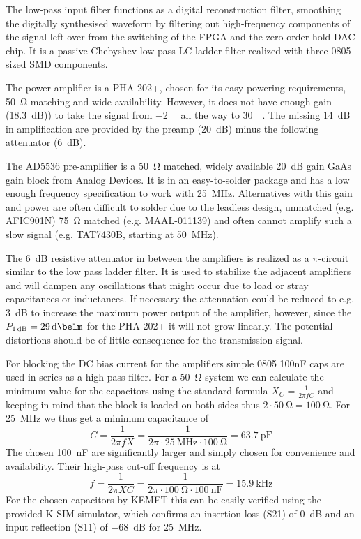 The low-pass input filter functions as a digital reconstruction filter, smoothing the digitally synthesised waveform by filtering out high-frequency components of the signal left over from the switching of the FPGA and the zero-order hold DAC chip. It is a passive Chebyshev low-pass LC ladder filter realized with three 0805-sized SMD components.

The power amplifier is a PHA-202+, chosen for its easy powering requirements, \qty{50}{\ohm} matching and wide availability. However, it does not have enough gain (\qty{18.3}{\deci\bel})) to take the signal from \qty{-2}{\deci\belm} all the way to \qty{+30}{\deci\belm}. The missing \qty{14}{\deci\bel} in amplification are provided by the preamp (\qty{20}{\deci\bel}) minus the following attenuator (\qty{6}{\deci\bel}).

The AD5536 pre-amplifier is a \qty{50}{\ohm} matched, widely available \qty{20}{\deci\bel} gain GaAs gain block from Analog Devices. It is in an easy-to-solder package and has a low enough frequency specification to work with \qty{25}{\mega\hertz}. Alternatives with this gain and power are often difficult to solder due to the leadless design, unmatched (e.g. AFIC901N) \qty{75}{\ohm} matched (e.g. MAAL-011139) and often cannot amplify such a slow signal (e.g. TAT7430B, starting at \qty{50}{\mega\hertz}).

The \qty{6}{\deci\bel} resistive attenuator in between the amplifiers is realized as a \(\pi\)-circuit similar to the low pass ladder filter. It is used to stabilize the adjacent amplifiers and will dampen any oscillations that might occur due to load or stray capacitances or inductances. If necessary the attenuation could be reduced to e.g. \qty{3}{\deci\bel} to increase the maximum power output of the amplifier, however, since the \(P_{\qty{1}{\deci\bel}} = \qty{29}{\deci\belm}\) for the PHA-202+ it will not grow linearly. The potential distortions should be of little consequence for the transmission signal.

For blocking the DC bias current for the amplifiers simple 0805 100nF caps are used in series as a high pass filter. For a \qty{50}{\ohm} system we can calculate the minimum value for the capacitors using the standard formula \(X_C = \frac{1}{2\pi{}fC}\) and keeping in mind that the block is loaded on both sides thus \( 2 \cdot \qty{50}{\ohm} = \qty{100}{\ohm}\). For \qty{25}{\mega\hertz} we thus get a minimum capacitance of
\[
    C = \frac{1}{2\pi{}fX} = \frac{1}{2\pi{} \cdot{} \qty{25}{\mega\hertz} \cdot{} \qty{100}{\ohm}} = \qty{63.7}{\pico\farad}
\]
The chosen \qty{100}{\nano\farad} are significantly larger and simply chosen for convenience and availability. Their high-pass cut-off frequency is at
\[
    f = \frac{1}{2\pi{}XC} = \frac{1}{2\pi{} \cdot{} \qty{100}{\ohm} \cdot{} \qty{100}{\nano\farad}} = \qty{15.9}{\kilo\hertz}
\]
For the chosen capacitors by KEMET this can be easily verified using the provided K-SIM simulator, which confirms an insertion loss (S21) of \qty{0}{\deci\bel} and an input reflection (S11) of \qty{-68}{\deci\bel} for \qty{25}{\mega\hertz}.


